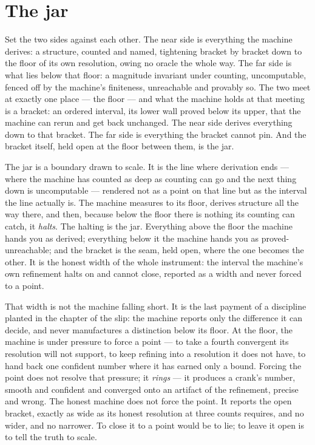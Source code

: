 \section{The jar}

Set the two sides against each other. The near side is everything the machine derives: a structure, counted and named,
tightening bracket by bracket down to the floor of its own resolution, owing no oracle the whole way. The far side is what
lies below that floor: a magnitude invariant under counting, uncomputable, fenced off by the machine's finiteness,
unreachable and provably so. The two meet at exactly one place --- the floor --- and what the machine holds at that
meeting is a bracket: an ordered interval, its lower wall proved below its upper, that the machine can rerun and get back
unchanged. The near side derives everything down to that bracket. The far side is everything the bracket cannot pin. And
the bracket itself, held open at the floor between them, is the jar.

The jar is a boundary drawn to scale. It is the line where derivation ends --- where the machine has counted as deep as
counting can go and the next thing down is uncomputable --- rendered not as a point on that line but as the interval the
line actually is. The machine measures to its floor, derives structure all the way there, and then, because below the
floor there is nothing its counting can catch, it \emph{halts}. The halting is the jar. Everything above the floor the
machine hands you as derived; everything below it the machine hands you as proved-unreachable; and the bracket is the
seam, held open, where the one becomes the other. It is the honest width of the whole instrument: the interval the
machine's own refinement halts on and cannot close, reported as a width and never forced to a point.

That width is not the machine falling short. It is the last payment of a discipline planted in the chapter of the slip:
the machine reports only the difference it can decide, and never manufactures a distinction below its floor. At the floor,
the machine is under pressure to force a point --- to take a fourth convergent its resolution will not support, to keep
refining into a resolution it does not have, to hand back one confident number where it has earned only a bound. Forcing
the point does not resolve that pressure; it \emph{rings} --- it produces a crank's number, smooth and confident and
converged onto an artifact of the refinement, precise and wrong. The honest machine does not force the point. It reports
the open bracket, exactly as wide as its honest resolution at three counts requires, and no wider, and no narrower. To
close it to a point
would be to lie; to leave it open is to tell the truth to scale.

